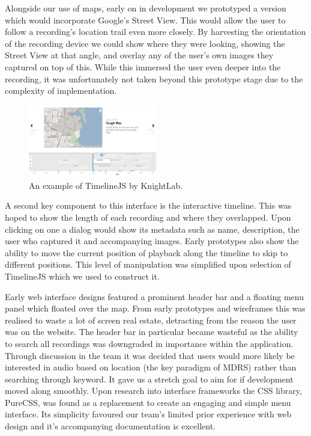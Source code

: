 \documentclass{l3proj}
\begin{document}
Alongside our use of maps, early on in development we prototyped a version which would incorporate Google's Street View. This would allow the user to follow a recording's location trail even more closely. By harvesting the orientation of the recording device we could show where they were looking, showing the Street View at that angle, and overlay any of the user's own images they captured on top of this. While this immersed the user even deeper into the recording, it was unfortunately not taken beyond this prototype stage due to the complexity of implementation.

\begin{figure}[ht!]
  \centering
\includegraphics[width=0.5\textwidth]{images/timeline-example.png}
\caption{An example of TimelineJS by KnightLab.}
\end{figure}

A second key component to this interface is the interactive timeline. This was
hoped to show the length of each recording and where they overlapped. Upon
clicking on one a dialog would show its metadata such as name, description, the
user who captured it and accompanying images. Early prototypes also show the
ability to move the current position of playback along the timeline to skip to
different positions. This level of manipulation was simplified upon selection of
TimelineJS which we used to construct it.

Early web interface designs featured a prominent header bar and a floating menu
panel which floated over the map. From early prototypes and wireframes this was
realised to waste a lot of screen real estate, detracting from the reason the
user was on the website. The header bar in particular became wasteful as the
ability to search all recordings was downgraded in importance within the
application. Through discussion in the team it was decided that users would more
likely be interested in audio based on location (the key paradigm of MDRS)
rather than searching through keyword. It gave us a stretch goal to aim for if
development moved along smoothly. Upon research into interface frameworks the
CSS library, PureCSS, was found as a replacement to create an engaging and
simple menu interface. Its simplicity favoured our team’s limited prior
experience with web design and it’s accompanying documentation is excellent.
\end{document}
